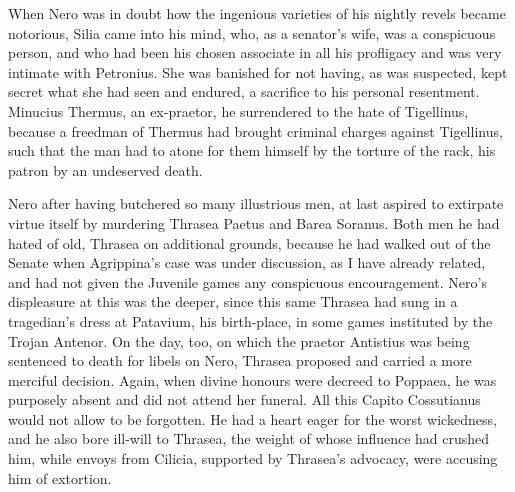 
When Nero was in doubt how the ingenious varieties of his nightly revels became notorious, Silia came into his mind, who, as a senator's wife, was a conspicuous person, and who had been his chosen associate in all his profligacy and was very intimate with Petronius. She was banished for not having, as was suspected, kept secret what she had seen and endured, a sacrifice to his personal resentment. Minucius Thermus, an ex-praetor, he surrendered to the hate of Tigellinus, because a freedman of Thermus had brought criminal charges against Tigellinus, such that the man had to atone for them himself by the torture of the rack, his patron by an undeserved death.


Nero after having butchered so many illustrious men, at last aspired to extirpate virtue itself by murdering Thrasea Paetus and Barea Soranus. Both men he had hated of old, Thrasea on additional grounds, because he had walked out of the Senate when Agrippina's case was under discussion, as I have already related, and had not given the Juvenile games any conspicuous encouragement. Nero's displeasure at this was the deeper, since this same Thrasea had sung in a tragedian's dress at Patavium, his birth-place, in some games instituted by the Trojan Antenor. On the day, too, on which the praetor Antistius was being sentenced to death for libels on Nero, Thrasea proposed and carried a more merciful decision. Again, when divine honours were decreed to Poppaea, he was purposely absent and did not attend her funeral. All this Capito Cossutianus would not allow to be forgotten. He had a heart eager for the worst wickedness, and he also bore ill-will to Thrasea, the weight of whose influence had crushed him, while envoys from Cilicia, supported by Thrasea's advocacy, were accusing him of extortion.


